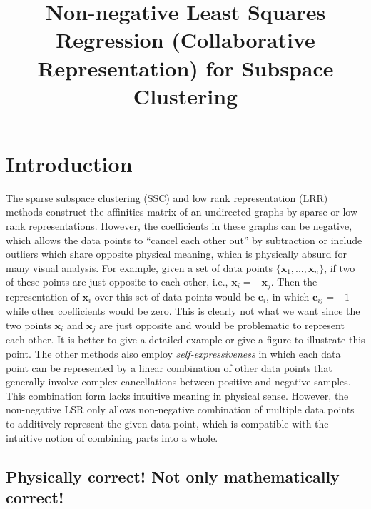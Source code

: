 \documentclass[10pt,twocolumn,letterpaper]{article}
\begin{document}
\title{Non-negative Least Squares Regression (Collaborative Representation) for Subspace Clustering}

\maketitle



\begin{abstract}

\end{abstract}

\section{Introduction}

The sparse subspace clustering (SSC) \cite{ssc} and low rank representation (LRR) \cite{lrr} methods construct the affinities matrix of an undirected graphs by sparse or low rank representations. However, the coefficients in these graphs can be negative, which allows the data points to ``cancel each other out'' by subtraction or include outliers which share opposite physical meaning, which is physically absurd for many visual analysis. For example, given a set of data points $\{\bm{x}_{1},...,\bm{x}_{n}\}$, if two of these points are just opposite to each other, i.e., $\bm{x}_{i}=-\bm{x}_{j}$. Then the representation of $\bm{x}_{i}$ over this set of data points would be $\bm{c}_{i}$, in which $\bm{c}_{ij}=-1$ while other coefficients would be zero. This is clearly not what we want since the two points $\bm{x}_{i}$ and $\bm{x}_{j}$ are just opposite and would be problematic to represent each other. It is better to give a detailed example or give a figure to illustrate this point. The other methods also employ \textsl{self-expressiveness} in which each data point can be represented by a linear combination of other data points that generally involve complex cancellations between positive and negative samples. This combination form lacks intuitive meaning in physical sense. However, the non-negative LSR only allows non-negative combination of multiple data points to additively represent the given data point, which is compatible with the intuitive notion of combining parts into a whole.

\subsection{Physically correct! Not only mathematically correct!}
\end{document}
